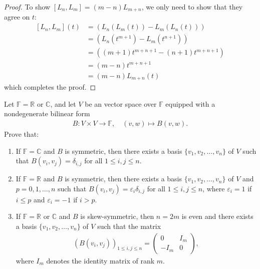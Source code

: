 \documentclass[../main.tex]{subfiles}
\begin{document}
\begin{proof}
     To show \(  \left[ L_{n},L_{m} \right]= \left( m-n \right)L_{m+ n}    \), we only need to show that they agree on \(  t  \): \[
     \begin{aligned}
      \left[ L_{n},L_{m} \right]\left( t \right)&=  \left( L_{n} \left( L_{m}\left( t \right)  \right)-L_{m}\left( L_{n}\left( t \right)  \right)   \right)\\ 
       &=    \left( L_{n}\left( t^{m+ 1} \right)-L_{m}\left( t^{n+ 1} \right)   \right)\\ 
        &= \left( \left( m+ 1 \right)t^{m+ n+ 1}  -  \left( n+ 1 \right)t^{m+ n+ 1} \right)\\ 
         &= \left( m-n \right) t^{m+ n+ 1}\\ 
          &= \left( m-n \right)L_{m+ n}\left( t \right)     
     \end{aligned}
     \]   which completes the proof.

    
\end{proof}

\begin{exercise}{}{}
Let $\mathbb{F} = \mathbb{R}$ or $\mathbb{C}$, and let $V$ be an  vector space over $\mathbb{F}$ equipped with a nondegenerate bilinear form
\[\begin{aligned}
B: V \times V \to \mathbb{F}, \quad (v,w) \mapsto B(v,w).
\end{aligned}\]
Prove that:
\begin{enumerate}
\item[(a)] If $\mathbb{F} = \mathbb{C}$ and $B$ is symmetric, then there exists a basis $\{v_1, v_2, \dots, v_n\}$ of $V$ such that $B(v_i, v_j) = \delta_{i,j}$ for all $1 \le i, j \le n$.
\item[(b)] If $\mathbb{F} = \mathbb{R}$ and $B$ is symmetric, then there exists a basis $\{v_1, v_2, \dots, v_n\}$ of $V$ and $p=0, 1, \dots, n$ such that $B(v_i, v_j) = \varepsilon_i \delta_{i,j}$ for all $1 \le i, j \le n$, where $\varepsilon_i = 1$ if $i \le p$ and $\varepsilon_i = -1$ if $i > p$.
\item[(c)] If $\mathbb{F} = \mathbb{R}$ or $\mathbb{C}$ and $B$ is skew-symmetric, then $n=2m$ is even and there exists a basis $\{v_1, v_2, \dots, v_n\}$ of $V$ such that the matrix
\[\begin{aligned}
(B(v_i, v_j))_{1 \le i, j \le n} = \begin{pmatrix} 0 & I_m \\ -I_m & 0 \end{pmatrix},
\end{aligned}\]
where $I_m$ denotes the identity matrix of rank $m$.
\end{enumerate}
\end{exercise}
\end{document}
